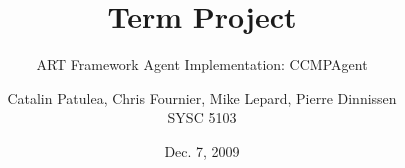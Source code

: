 
\title{Term Project}

\subtitle{ART Framework Agent Implementation: CCMPAgent}

\author{Catalin Patulea, Chris Fournier, Mike Lepard, Pierre Dinnissen\\SYSC
5103}
\date{Dec. 7, 2009}
\subject{Term Project}
